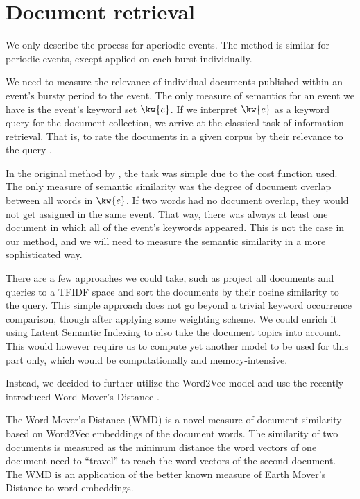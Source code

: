 \section{Document retrieval}
We only describe the process for aperiodic events. The method is similar for periodic events, except applied on each burst individually.

We need to measure the relevance of individual documents published within an event's bursty period to the event. The only measure of semantics for an event we have is the event's keyword set $\kw{e}$. If we interpret $\kw{e}$ as a keyword query for the document collection, we arrive at the classical task of information retrieval. That is, to rate the documents in a given corpus by their relevance to the query \cite{information-retrieval}.

In the original method by \cite{event-detection}, the task was simple due to the cost function used. The only measure of semantic similarity was the degree of document overlap between all words in $\kw{e}$. If two words had no document overlap, they would not get assigned in the same event. That way, there was always at least one document in which all of the event's keywords appeared. This is not the case in our method, and we will need to measure the semantic similarity in a more sophisticated way.

There are a few approaches we could take, such as project all documents and queries to a TFIDF space \cite{information-retrieval} and sort the documents by their cosine similarity to the query. This simple approach does not go beyond a trivial keyword occurrence comparison, though after applying some weighting scheme. We could enrich it using Latent Semantic Indexing \cite{lsi} to also take the document topics into account. This would however require us to compute yet another model to be used for this part only, which would be computationally and memory-intensive.

Instead, we decided to further utilize the Word2Vec model and use the recently introduced Word Mover's Distance \cite{wmd}.

The Word Mover's Distance (WMD) is a novel measure of document similarity based on Word2Vec embeddings of the document words. The similarity of two documents is measured as the minimum distance the word vectors of one document need to ``travel'' to reach the word vectors of the second document. The WMD is an application of the better known measure of Earth Mover's Distance \cite{emd} to word embeddings.

